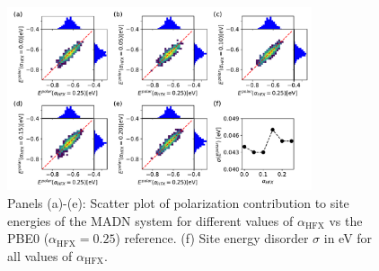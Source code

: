 \documentclass[%
 reprint,
superscriptaddress,
 amsmath,amssymb,
 aps,
prb,
floatfix
]{revtex4-2}
\newcommand{\ahfx}{\ensuremath{\alpha_\text{HFX}}\xspace}
\begin{document}
\begin{figure}
  \centering
  \includegraphics[width=0.80\textwidth]{fig10.pdf}
  \caption{Panels (a)-(e): Scatter plot of polarization contribution to site energies of the MADN system for different values of \ahfx vs the PBE0 ($\ahfx=0.25$) reference. (f) Site energy disorder $\sigma$ in \unit[]{eV} for all values of \ahfx.}
  \label{fig:Edip_qmmm_MADN}
\end{figure}
\end{document}

